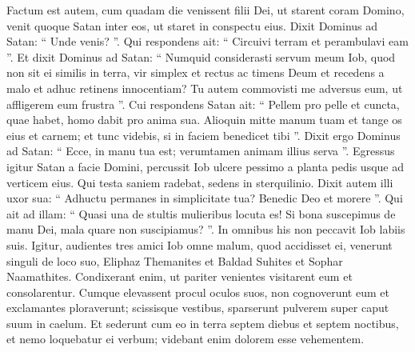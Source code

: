 \begin{biblechapter}
\begin{biblechapter}
\verse Factum est autem, cum quadam die venissent filii Dei, ut starent coram Domino, venit quoque Satan inter eos, ut staret in conspectu eius. 
\verse Dixit Dominus ad Satan: “ Unde venis? ”. Qui respondens ait: “ Circuivi terram et perambulavi eam ”.
 \verse Et dixit Dominus ad Satan: “ Numquid considerasti servum meum Iob, quod non sit ei similis in terra, vir simplex et rectus ac timens Deum et recedens a malo et adhuc retinens innocentiam? Tu autem commovisti me adversus eum, ut affligerem eum frustra ”. 
\verse Cui respondens Satan ait: “ Pellem pro pelle et cuncta, quae habet, homo dabit pro anima sua. 
\verse Alioquin mitte manum tuam et tange os eius et carnem; et tunc videbis, si in faciem benedicet tibi ”. 
\verse Dixit ergo Dominus ad Satan: “ Ecce, in manu tua est; verumtamen animam illius serva ”.
 \verse Egressus igitur Satan a facie Domini, percussit Iob ulcere pessimo a planta pedis usque ad verticem eius. 
\verse Qui testa saniem radebat, sedens in sterquilinio. 
\verse Dixit autem illi uxor sua:
 “ Adhuctu permanes in simplicitate tua?
 Benedic Deo et morere ”.
 \verse Qui ait ad illam:
 “ Quasi una de stultis mulieribus
 locuta es!
 Si bona suscepimus de manu Dei,
 mala quare non suscipiamus? ”.
 In omnibus his non peccavit Iob labiis suis.
 \verse Igitur, audientes tres amici Iob omne malum, quod accidisset ei, venerunt singuli de loco suo, Eliphaz Themanites et Baldad Suhites et Sophar Naamathites. Condixerant enim, ut pariter venientes visitarent eum et consolarentur. 
\verse Cumque elevassent procul oculos suos, non cognoverunt eum et exclamantes ploraverunt; scissisque vestibus, sparserunt pulverem super caput suum in caelum. 
\verse Et sederunt cum eo in terra septem diebus et septem noctibus, et nemo loquebatur ei verbum; videbant enim dolorem esse vehementem.
 

\end{biblechapter}
\end{biblechapter}
